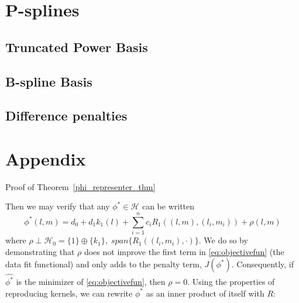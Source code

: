 \documentclass[12pt]{article}
\theoremstyle{definition}
\begin{document}
\section{P-splines}

\subsection{Truncated Power Basis}

\subsection{B-spline Basis}
\subsection{Difference penalties}






\section{Appendix}


Proof of Theorem~\ref{phi_representer_thm}

Then we may verify that any $\phi^* \in \mathcal{H}$ can be written 
\[
\phi^*\left(l,m \right) = d_0 + d_1k_1\left(l\right) + \sum_{i=1}^n  c_i R_1\left( \left(l,m\right) , \left(l_i,m_i \right)\right) + \rho\left(l,m\right)
\]
\noindent
where $\rho \perp \mathcal{H}_0 = \lbrace 1\rbrace \oplus \lbrace k_1\rbrace,\; span\lbrace R_1\left(\left(l_i, m_i \right),\cdot \right)  \rbrace$. We do so by demonstrating that  $\rho$ does not improve the first term in \eqref{eq:objectivefun} (the data fit functional) and only adds to the penalty term, $J\left(\phi^*\right)$. Consequently, if $\hat{\phi^*}$ is the minimizer of \eqref{eq:objectivefun}, then $\rho = 0$. Using the properties of reproducing kernels, we can rewrite $\phi^*$ as an inner product of itself with $R$:
 
\end{document}
